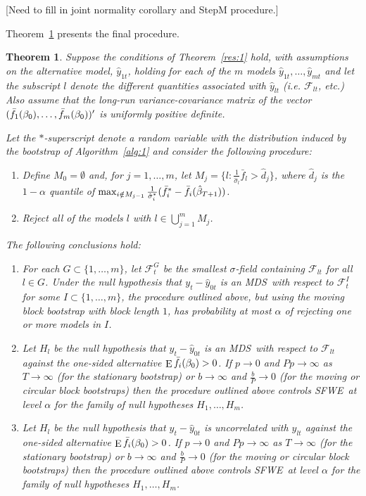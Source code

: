 \documentclass[12pt,fleqn]{article}
\newtheorem{thm}{Theorem}
\theoremstyle{definition}
\DeclareMathOperator{\E}{E}
\newcommand{\btrue}[1][]{\if#1*\hat\beta_{T+1}\else\beta_0\fi}
\newcommand{\mds}{MDS}
\newcommand{\sfwe}{SFWE}
\begin{document}
[Need to fill in joint normality corollary and StepM procedure.]

Theorem~\ref{res:2} presents the final procedure.

\begin{thm}\label{res:2}
  Suppose the conditions of Theorem~\ref{res:1} hold, with assumptions
  on the alternative model, $\hat{y}_{1t}$, holding for each of the
  $m$ models $\hat{y}_{1t}, \dots, \hat{y}_{mt}$ and let the subscript
  $l$ denote the different quantities associated with $\hat{y}_{lt}$
  (i.e. $\mathcal{F}_{lt}$, etc.)  Also assume that the long-run
  variance-covariance matrix of the vector
  $(\bar{f}_1(\btrue),\dots,\bar{f}_m(\btrue))'$ is uniformly
  positive definite.

  Let the $*$-superscript denote a random variable with the
  distribution induced by the bootstrap of Algorithm~\ref{alg:1} and
  consider the following procedure:
  \begin{enumerate}
  \item Define $M_0 = \emptyset$ and, for $j = 1,\dots,m$, let $M_j =
    \{l : \tfrac1{\hat\sigma_l} \bar{f}_{l} > \hat{d}_j\}$, where
    $\hat{d}_j$ is the $1-\alpha$ quantile of $\max_{i \notin M_{j-1}}
    \tfrac{1}{\hat{\sigma}_i^{*}}(\bar{f}_{i}^{*} -
    \bar{f_i}(\btrue[*]))$.
  \item Reject all of the models $l$ with $l \in \bigcup_{j=1}^m M_j$.
  \end{enumerate}
  The following conclusions hold:
  \begin{enumerate}
  \item\label{it:1} For each $G \subset \{1,\dots,m\}$, let
    $\mathcal{F}_t^G$ be the smallest $\sigma$-field containing
    $\mathcal{F}_{lt}$ for all $l \in G$.  Under the null hypothesis
    that $y_t - \hat{y}_{0t}$ is an \mds\ with respect to
    $\mathcal{F}_t^I$ for some $I \subset \{1,\dots,m\}$, the
    procedure outlined above, but using the moving block bootstrap
    with block length $1$, has probability at most $\alpha$ of
    rejecting one or more models in $I$.
  \item\label{it:2} Let $H_l$ be the null hypothesis that $y_t -
    \hat{y}_{0t}$ is an \mds\ with respect to
    $\mathcal{F}_{lt}$ against the one-sided alternative $\E \bar
    f_i(\btrue) > 0$.  If $p \to 0$ and $P p \to \infty$ as $T \to
    \infty$ (for the stationary bootstrap) or $b \to \infty$ and
    $\frac{b}{P} \to 0$ (for the moving or circular block bootstraps)
    then the procedure outlined above controls \sfwe\ at level
    $\alpha$ for the family of null hypotheses $H_1,\dots,H_m$.
  \item\label{it:3} Let $H_l$ be the null hypothesis that $y_t -
    \hat{y}_{0t}$ is uncorrelated with $\hat{y}_{lt}$ against the
    one-sided alternative $\E \bar f_i(\btrue) > 0$.  If $p \to 0$
    and $P p \to \infty$ as $T \to \infty$ (for the stationary
    bootstrap) or $b \to \infty$ and $\frac{b}{P} \to 0$ (for the
    moving or circular block bootstraps) then the procedure outlined
    above controls \sfwe\ at level $\alpha$ for the family of
    null hypotheses $H_1,\dots,H_m$.
  \end{enumerate}
\end{thm}
\end{document}
